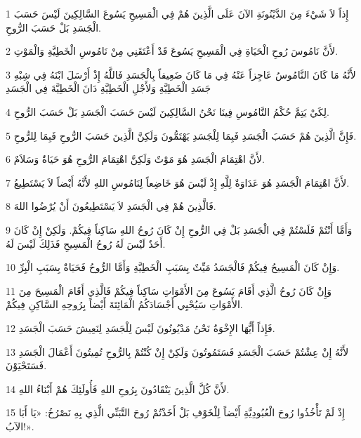 \par 1 إِذاً لاَ شَيْءَ مِنَ الدَّيْنُونَةِ الآنَ عَلَى الَّذِينَ هُمْ فِي الْمَسِيحِ يَسُوعَ السَّالِكِينَ لَيْسَ حَسَبَ الْجَسَدِ بَلْ حَسَبَ الرُّوحِ.
\par 2 لأَنَّ نَامُوسَ رُوحِ الْحَيَاةِ فِي الْمَسِيحِ يَسُوعَ قَدْ أَعْتَقَنِي مِنْ نَامُوسِ الْخَطِيَّةِ وَالْمَوْتِ.
\par 3 لأَنَّهُ مَا كَانَ النَّامُوسُ عَاجِزاً عَنْهُ فِي مَا كَانَ ضَعِيفاً بِالْجَسَدِ فَاللَّهُ إِذْ أَرْسَلَ ابْنَهُ فِي شِبْهِ جَسَدِ الْخَطِيَّةِ وَلأَجْلِ الْخَطِيَّةِ دَانَ الْخَطِيَّةَ فِي الْجَسَدِ
\par 4 لِكَيْ يَتِمَّ حُكْمُ النَّامُوسِ فِينَا نَحْنُ السَّالِكِينَ لَيْسَ حَسَبَ الْجَسَدِ بَلْ حَسَبَ الرُّوحِ.
\par 5 فَإِنَّ الَّذِينَ هُمْ حَسَبَ الْجَسَدِ فَبِمَا لِلْجَسَدِ يَهْتَمُّونَ وَلَكِنَّ الَّذِينَ حَسَبَ الرُّوحِ فَبِمَا لِلرُّوحِ.
\par 6 لأَنَّ اهْتِمَامَ الْجَسَدِ هُوَ مَوْتٌ وَلَكِنَّ اهْتِمَامَ الرُّوحِ هُوَ حَيَاةٌ وَسَلاَمٌ.
\par 7 لأَنَّ اهْتِمَامَ الْجَسَدِ هُوَ عَدَاوَةٌ لِلَّهِ إِذْ لَيْسَ هُوَ خَاضِعاً لِنَامُوسِ اللهِ لأَنَّهُ أَيْضاً لاَ يَسْتَطِيعُ.
\par 8 فَالَّذِينَ هُمْ فِي الْجَسَدِ لاَ يَسْتَطِيعُونَ أَنْ يُرْضُوا اللهَ.
\par 9 وَأَمَّا أَنْتُمْ فَلَسْتُمْ فِي الْجَسَدِ بَلْ فِي الرُّوحِ إِنْ كَانَ رُوحُ اللهِ سَاكِناً فِيكُمْ. وَلَكِنْ إِنْ كَانَ أَحَدٌ لَيْسَ لَهُ رُوحُ الْمَسِيحِ فَذَلِكَ لَيْسَ لَهُ.
\par 10 وَإِنْ كَانَ الْمَسِيحُ فِيكُمْ فَالْجَسَدُ مَيِّتٌ بِسَبَبِ الْخَطِيَّةِ وَأَمَّا الرُّوحُ فَحَيَاةٌ بِسَبَبِ الْبِرِّ.
\par 11 وَإِنْ كَانَ رُوحُ الَّذِي أَقَامَ يَسُوعَ مِنَ الأَمْوَاتِ سَاكِناً فِيكُمْ فَالَّذِي أَقَامَ الْمَسِيحَ مِنَ الأَمْوَاتِ سَيُحْيِي أَجْسَادَكُمُ الْمَائِتَةَ أَيْضاً بِرُوحِهِ السَّاكِنِ فِيكُمْ.
\par 12 فَإِذاً أَيُّهَا الإِخْوَةُ نَحْنُ مَدْيُونُونَ لَيْسَ لِلْجَسَدِ لِنَعِيشَ حَسَبَ الْجَسَدِ.
\par 13 لأَنَّهُ إِنْ عِشْتُمْ حَسَبَ الْجَسَدِ فَسَتَمُوتُونَ وَلَكِنْ إِنْ كُنْتُمْ بِالرُّوحِ تُمِيتُونَ أَعْمَالَ الْجَسَدِ فَسَتَحْيَوْنَ.
\par 14 لأَنَّ كُلَّ الَّذِينَ يَنْقَادُونَ بِرُوحِ اللهِ فَأُولَئِكَ هُمْ أَبْنَاءُ اللهِ.
\par 15 إِذْ لَمْ تَأْخُذُوا رُوحَ الْعُبُودِيَّةِ أَيْضاً لِلْخَوْفِ بَلْ أَخَذْتُمْ رُوحَ التَّبَنِّي الَّذِي بِهِ نَصْرُخُ: «يَا أَبَا الآبُ!».
